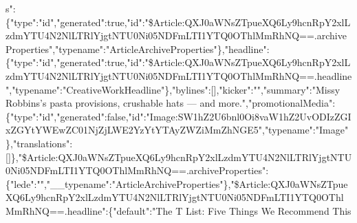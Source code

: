 s":\{"type":"id","generated":true,"id":"\$Article:QXJ0aWNsZTpueXQ6Ly9hcnRpY2xlLzdmYTU4N2NlLTRlYjgtNTU0Ni05NDFmLTI1YTQ0OThlMmRhNQ==.archiveProperties","typename":"ArticleArchiveProperties"\},"headline":\{"type":"id","generated":true,"id":"\$Article:QXJ0aWNsZTpueXQ6Ly9hcnRpY2xlLzdmYTU4N2NlLTRlYjgtNTU0Ni05NDFmLTI1YTQ0OThlMmRhNQ==.headline","typename":"CreativeWorkHeadline"\},"bylines":{[}{]},"kicker":"","summary":"Missy
Robbins's pasta provisions, crushable hats --- and
more.","promotionalMedia":\{"type":"id","generated":false,"id":"Image:SW1hZ2U6bnl0Oi8vaW1hZ2UvODIzZGIxZGYtYWEwZC01NjZjLWE2YzYtYTAyZWZiMmZhNGE5","typename":"Image"\},"translations":{[}{]}\},"\$Article:QXJ0aWNsZTpueXQ6Ly9hcnRpY2xlLzdmYTU4N2NlLTRlYjgtNTU0Ni05NDFmLTI1YTQ0OThlMmRhNQ==.archiveProperties":\{"lede":"","\_\_typename":"ArticleArchiveProperties"\},"\$Article:QXJ0aWNsZTpueXQ6Ly9hcnRpY2xlLzdmYTU4N2NlLTRlYjgtNTU0Ni05NDFmLTI1YTQ0OThlMmRhNQ==.headline":\{"default":"The
T List: Five Things We Recommend This

